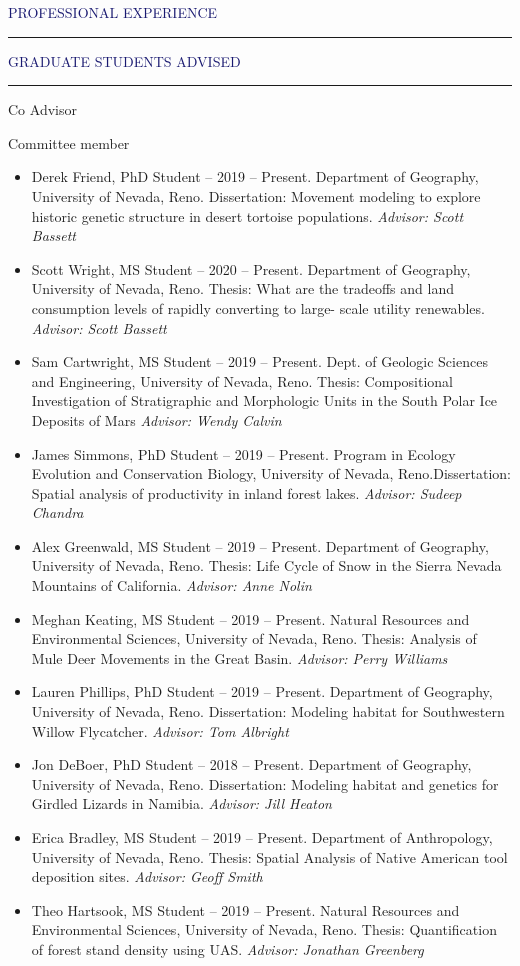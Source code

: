 \documentclass{resume} %
\renewenvironment{rSection}[1]{
\sectionskip
\textcolor{MidnightBlue}{\MakeUppercase{#1}}
\sectionlineskip
\hrule
\begin{list}{}{
\setlength{\leftmargin}{1.5em}
}
\item[]
}{
\end{list}
}
\begin{document}
\begin{rSection}{Professional Experience}
\begin{rSection}{Graduate Students Advised}
\begin{rSubsection}{Co Advisor}{}{}{}
\end{rSubsection}
\begin{rSubsection}{Committee member}{}{}{}
\begin{itemize}
	\item Derek Friend, PhD Student – 2019 – Present. Department of Geography, University of Nevada, Reno. Dissertation: Movement modeling to explore historic genetic structure in desert tortoise populations. \textit{Advisor: Scott Bassett}
\item Scott Wright, MS Student – 2020 – Present. Department of Geography, University of Nevada, Reno. Thesis: What are the tradeoffs and land consumption levels of rapidly converting to large- scale utility renewables. \textit{Advisor: Scott Bassett}
\item Sam Cartwright, MS Student  – 2019 – Present. Dept. of Geologic Sciences and Engineering, University of Nevada, Reno.  Thesis: Compositional Investigation of Stratigraphic and Morphologic Units in the South Polar Ice Deposits of Mars \textit{Advisor: Wendy Calvin}
\item James Simmons, PhD Student –  2019 – Present. Program in Ecology Evolution and Conservation Biology, University of Nevada, Reno.Dissertation: Spatial analysis of productivity in inland forest lakes. \textit{Advisor: Sudeep Chandra}
\item Alex Greenwald, MS Student – 2019 – Present. Department of Geography, University of Nevada, Reno. Thesis: Life Cycle of Snow in the Sierra Nevada Mountains of California. \textit{Advisor: Anne Nolin}
\item Meghan Keating, MS Student – 2019 – Present. Natural Resources and Environmental Sciences, University of Nevada, Reno. Thesis: Analysis of Mule Deer Movements in the Great Basin. \textit{Advisor: Perry Williams}
\item Lauren Phillips, PhD Student – 2019 – Present. Department of Geography, University of Nevada, Reno. Dissertation: Modeling habitat for Southwestern Willow Flycatcher. \textit{Advisor: Tom Albright}
\item Jon DeBoer, PhD Student – 2018 – Present. Department of Geography, University of Nevada, Reno. Dissertation: Modeling habitat and genetics for Girdled Lizards in Namibia. \textit{Advisor: Jill Heaton}
\item Erica Bradley, MS Student – 2019 – Present. Department of Anthropology, University of Nevada, Reno. Thesis: Spatial Analysis of Native American tool deposition sites. \textit{Advisor: Geoff Smith}
\item Theo Hartsook, MS Student – 2019 – Present. Natural Resources and Environmental Sciences, University of Nevada, Reno. Thesis: Quantification of forest stand density using UAS.  \textit{Advisor: Jonathan Greenberg}

\end{itemize}
\end{rSubsection}
\end{rSection}
\end{rSection}
\end{document}
